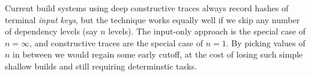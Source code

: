 Current build systems using deep constructive traces always record hashes of
terminal \emph{input keys}, but the technique works equally well if we skip any
number of dependency levels (say $n$ levels). The input-only approach is the
special case of $n = \infty$, and constructive traces are the special case of
$n = 1$. By picking values of $n$ in between we would regain some early cutoff, at the
cost of losing such simple shallow builds and still requiring determinstic tasks.
